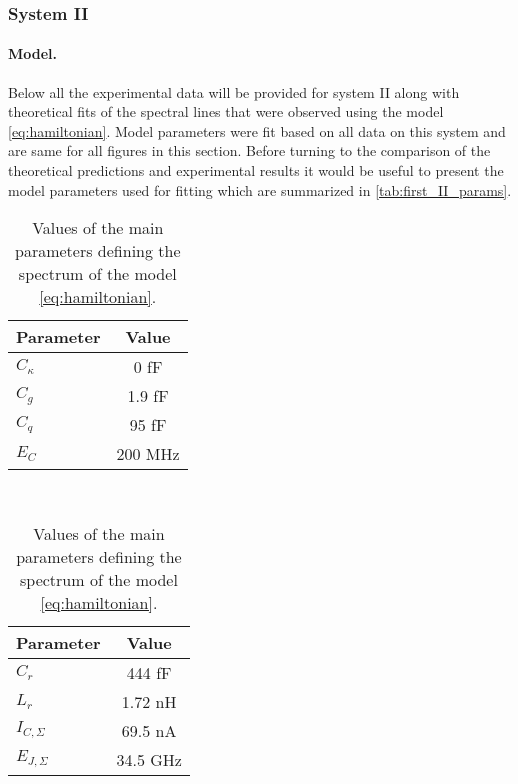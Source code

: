 \documentclass[12pt, twoside]{report}
\numberwithin{equation}{section}
\begin{document}
\subsubsection{System II}

\paragraph{Model.} Below all the experimental data will be provided for system II along with theoretical fits of the spectral lines that were observed using the model \eqref{eq:hamiltonian}. Model parameters were fit based on all data on this system and are same for all figures in this section. Before turning to the comparison of the theoretical predictions and experimental results it would be useful to present the model parameters used for fitting which are summarized in \autoref{tab:first_II_params}.

\begin{table}[h]
\centering
\begin{tabular}{l|c}
Parameter & Value \\
\hline 
$C_\kappa$ & 0 fF \\
\hline
$C_g$ & 1.9 fF \\
\hline
$C_q$ & 95 fF \\
\hline
$E_C$ & 200 MHz
\end{tabular}~
\begin{tabular}{l|c}
Parameter & Value\\
\hline
$C_r$ & 444 fF \\
\hline
$L_r$ & 1.72 nH \\
\hline
$I_{C, \Sigma}$ & 69.5 nA \\
\hline
$E_{J, \Sigma}$ & 34.5 GHz
\end{tabular}
\caption{Values of the main parameters defining the spectrum of the model \eqref{eq:hamiltonian}.}
\label{tab:first_II_params}
\end{table}
\end{document}
